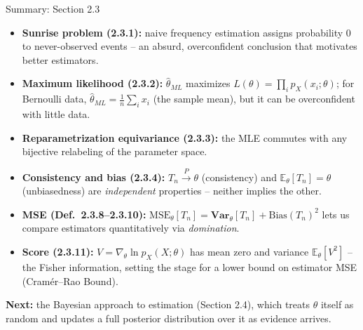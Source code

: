 \documentclass[aspectratio=169,10pt]{beamer}
\begin{document}
\begin{frame}{Summary: Section 2.3}
  \begin{itemize}
    \item \textbf{Sunrise problem (2.3.1):} naive frequency estimation
      assigns probability $0$ to never-observed events -- an absurd,
      overconfident conclusion that motivates better estimators.
    \item \textbf{Maximum likelihood (2.3.2):} $\widehat{\theta}_{ML}$
      maximizes $L(\theta)=\prod_i p_X(x_i;\theta)$; for Bernoulli data,
      $\widehat{\theta}_{ML} = \frac{1}{n}\sum_i x_i$ (the sample mean), but
      it can be overconfident with little data.
    \item \textbf{Reparametrization equivariance (2.3.3):} the MLE commutes
      with any bijective relabeling of the parameter space.
    \item \textbf{Consistency and bias (2.3.4):} $T_n \xrightarrow{P}
      \theta$ (consistency) and $\mathbb{E}_\theta[T_n]=\theta$
      (unbiasedness) are \emph{independent} properties -- neither implies
      the other.
    \item \textbf{MSE (Def.\ 2.3.8--2.3.10):}
      $\mathrm{MSE}_\theta[T_n]=\mathbf{Var}_\theta[T_n]+\mathrm{Bias}(T_n)^2$
      lets us compare estimators quantitatively via \emph{domination}.
    \item \textbf{Score (2.3.11):} $V=\nabla_\theta \ln p_X(X;\theta)$ has
      mean zero and variance $\mathbb{E}_\theta[V^2]$ -- the Fisher
      information, setting the stage for a lower bound on estimator MSE
      (Cram\'er--Rao Bound).
  \end{itemize}
  \vspace{0.3cm}
  \textbf{Next:} the Bayesian approach to estimation (Section 2.4), which
  treats $\theta$ itself as random and updates a full posterior
  distribution over it as evidence arrives.
\end{frame}
\end{document}
